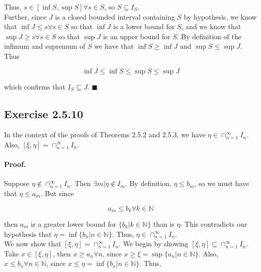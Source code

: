 \documentclass[paper=a4, fontsize=11pt]{scrartcl} %
\numberwithin{equation}{section} %
\numberwithin{figure}{section} %
\numberwithin{table}{section} %
\begin{document}
Thus, $s \in [\inf S, \sup S] \forall s \in S$, so $S \subseteq I_S$.\\

Further, since $J$ is a closed bounded interval containing $S$ by hypothesis, we know that $\inf J \leq s \forall s \in S$ so that $\inf J$ is a lower bound for $S$, and we know that $\sup J \geq s \forall s \in S$ so that $\sup J$ is an upper bound for $S$. By definition of the infimum and supremum of $S$ we have that $\inf S \geq \inf J$ and $\sup S \leq \sup J$. Thus

\begin{equation}
\inf J \leq \inf S \leq \sup S \leq \sup J
\end{equation}

which confirms that $I_S \subseteq J$. $\blacksquare$\\

\subsection*{Exercise 2.5.10}

In the context of the proofs of Theorems 2.5.2 and 2.5.3, we have $\eta \in \cap_{n=1}^{\infty} I_n$. Also, $[\xi, \eta] = \cap_{n=1}^{\infty} I_n$.\\

\paragraph{Proof.} Suppose $\eta \notin \cap_{n=1}^{\infty} I_n$. Then $\exists m | \eta \notin I_m$. By definition, $\eta \leq b_m$, so we must have that $\eta \leq a_m$. But since

\begin{equation}
a_m \leq b_k \forall k \in \mathbb{N}
\end{equation}

then $a_m$ is a greater lower bound for $\{b_k | k \in \mathbb{N}\}$ than is $\eta$. This contradicts our hypothesis that $\eta = \inf \{b_n | n \in \mathbb{N}\}$. Thus, $\eta \in \cap_{n=1}^{\infty} I_n$.\\

We now show that $[\xi, \eta] = \cap_{n=1}^{\infty} I_n$. We begin by showing $[\xi, \eta] \subseteq \cap_{n=1}^{\infty} I_n$. Take $x \in [\xi, \eta]$, then $x \geq a_n \forall n$, since $x \geq \xi = \sup \{a_n | n \in \mathbb{N}\}$. Also, $x \leq b_n \forall n \in \mathbb{N}$, since $x \leq \eta = \inf \{b_n | n \in \mathbb{N}\}$. Thus,
\end{document}
